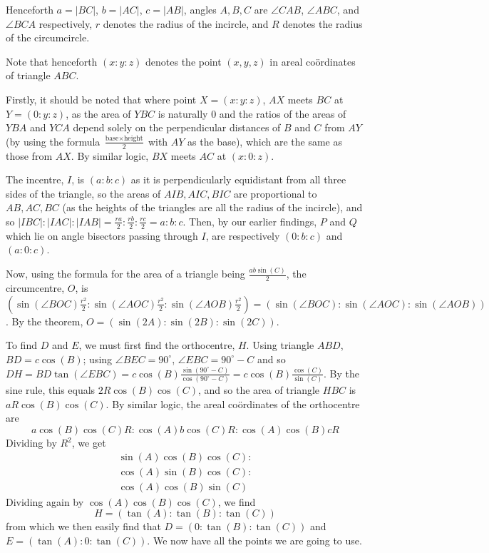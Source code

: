 \documentclass[11pt,a4paper]{report}
\begin{document}
	\begin{multicols}{2}
		
		Henceforth \(a=|BC|\), \(b=|AC|\), \(c=|AB|\), angles \(A,B,C\) are \(\angle{}CAB\), \(\angle{}ABC\), and \(\angle{}BCA\) respectively, \(r\) denotes the radius of the incircle, and \(R\) denotes the radius of the circumcircle.
		
		Note that henceforth \((x:y:z)\) denotes the point \((x,y,z)\) in areal coördinates of triangle \(ABC\).
		
		Firstly, it should be noted that where point \(X=(x:y:z)\), \(AX\) meets \(BC\) at \(Y=(0:y:z)\), as the area of \(YBC\) is naturally 0 and the ratios of the areas of \(YBA\) and \(YCA\) depend solely on the perpendicular distances of \(B\) and \(C\) from \(AY\) (by using the formula \(\frac{\textrm{base}\times{}\textrm{height}}{2}\) with \(AY\) as the base), which are the same as those from \(AX\). By similar logic, \(BX\) meets \(AC\) at \((x:0:z)\).
		
		The incentre, \(I\), is \((a:b:c)\) as it is perpendicularly equidistant from all three sides of the triangle, so the areas of \(AIB, AIC, BIC\) are proportional to \(AB, AC, BC\) (as the heights of the triangles are all the radius of the incircle), and so \(|IBC|:|IAC|:|IAB|=\frac{ra}{2}:\frac{rb}{2}:\frac{rc}{2}=a:b:c\). Then, by our earlier findings, \(P\) and \(Q\) which lie on angle bisectors passing through \(I\), are respectively \((0:b:c)\) and \((a:0:c)\).
		
		Now, using the formula for the area of a triangle being \(\frac{ab\sin(C)}{2}\), the circumcentre, \(O\), is \((\sin(\angle{}BOC)\frac{r^2}{2}:\sin(\angle{}AOC)\frac{r^2}{2}:\sin(\angle{}AOB)\frac{r^2}{2})=(\sin(\angle{}BOC):\sin(\angle{}AOC):\sin(\angle{}AOB))\). By the  theorem, \(O=(\sin(2A):\sin(2B):\sin(2C))\).
		
		To find \(D\) and \(E\), we must first find the orthocentre, \(H\). Using triangle \(ABD\), \(BD=c\cos(B)\); using \(\angle{}BEC=90^{\circ}\), \(\angle{}EBC=90^{\circ}-C\) and so \(DH=BD\tan(\angle{}EBC)=c\cos(B)\frac{\sin(90^{\circ}-C)}{\cos(90^{\circ}-C)}=c\cos(B)\frac{\cos(C)}{\sin(C)}\). By the sine rule, this equals \(2R\cos(B)\cos(C)\), and so the area of triangle \(HBC\) is \(aR\cos(B)\cos(C)\). By similar logic, the areal coördinates of the orthocentre are
		\[a\cos(B)\cos(C)R:\cos(A)b\cos(C)R:\cos(A)\cos(B)cR\]
		Dividing by \(R^2\), we get
		\[\begin{split}
		\sin(A)\cos(B)\cos(C):\\
		\cos(A)\sin(B)\cos(C):\\
		\cos(A)\cos(B)\sin(C)
		\end{split}\]
		Dividing again by \(\cos(A)\cos(B)\cos(C)\), we find
		\[H=(\tan(A):\tan(B):\tan(C))\]
		from which we then easily find that \(D=(0:\tan(B):\tan(C))\) and \(E=(\tan(A):0:\tan(C))\). We now have all the points we are going to use.
		

\end{multicols}
\end{document}
